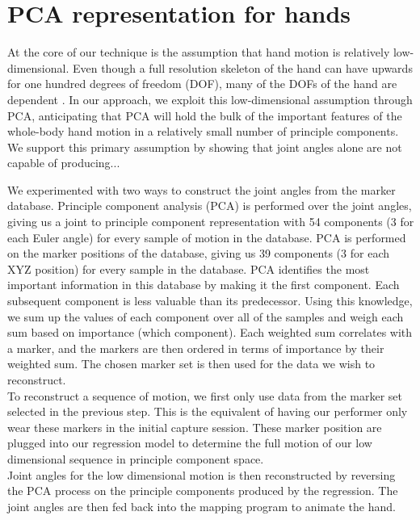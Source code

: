\section{PCA representation for hands}

At the core of our technique is the assumption that hand motion is
relatively low-dimensional.  Even though a full resolution skeleton
of the hand can have upwards for one hundred degrees of freedom (DOF),
many of the DOFs of the hand are dependent \cite{SanFlaSoe98,BraZha04,JoeOSu09}. In our approach, we exploit
this low-dimensional assumption through PCA, anticipating that PCA
will hold the bulk of the important features of the whole-body hand
motion in a relatively small number of principle components.  We
support this primary assumption by showing that joint angles alone
are not capable of producing... 

We experimented with two ways to construct 
the joint angles from the 
marker database.
Principle component analysis (PCA) is performed 
over the joint angles, giving us a joint to principle component 
representation with 54 components (3 for each Euler angle) 
for every sample of motion in the database.  
%
PCA is performed on the marker positions of the 
database, giving us 39 components (3 for each XYZ position) for every 
sample in the database. PCA identifies the most important information 
in this database by making it the first component. Each subsequent 
component is less valuable than its predecessor. Using this knowledge, 
we sum up the values of each component over all of the samples and 
weigh each sum based on importance (which component). Each weighted 
sum correlates with a marker, and the markers are then ordered in terms 
of importance by their weighted sum. The chosen marker set is then 
used for the data we wish to reconstruct. \\

To reconstruct a sequence of motion, we first only use data from the 
marker set selected in the previous step. This is the equivalent of 
having our performer only wear these markers in the initial capture 
session. These marker position are plugged into our regression model 
to determine the full motion of our low dimensional sequence in 
principle component space. \\

Joint angles for the low dimensional motion is then reconstructed 
by reversing the PCA process on the principle components produced by 
the regression. The joint angles are then fed back into the mapping 
program to animate the hand.